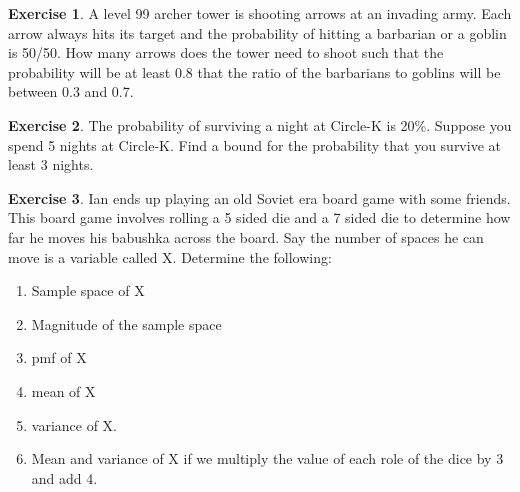 \documentclass[12pt]{amsart}
\theoremstyle{definition}
\newtheorem{exercise}{Exercise}
\numberwithin{equation}{section}
\theoremstyle{plain}
\begin{document}
\begin{exercise}
A level 99 archer tower is shooting arrows at an invading army. Each arrow always hits its target and the probability of hitting a barbarian or a goblin is 50/50. How many arrows does the tower need to shoot such that the probability will be at least 0.8 that the ratio of the barbarians to goblins will be between 0.3 and 0.7.
\end{exercise}

\begin{exercise}
The probability of surviving a night at Circle-K is 20\%. Suppose you spend 5 nights at Circle-K. Find a bound for the probability that you survive at least 3 nights.
\end{exercise}

\begin{exercise}
Ian ends up playing an old Soviet era board game with some friends. This board game involves rolling a 5 sided die and a 7 sided die to determine how far he moves his babushka across the board. Say the number of spaces he can move is a variable called X. Determine the following: 
\begin{enumerate}[label=\Alph*.]
\item Sample space of X
\item Magnitude of the sample space
\item pmf of X
\item mean of X
\item variance of X.
\item Mean and variance of X if we multiply the value of each role of the dice by 3 and add 4.
\end{enumerate}
\end{exercise}
\end{document}
